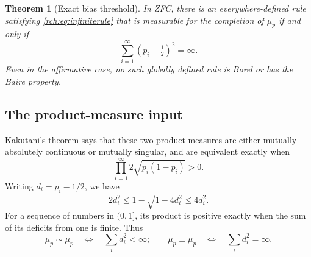 \documentclass[11pt]{article}
\newtheorem{theorem}{Theorem}[section]
\theoremstyle{definition}
\theoremstyle{remark}
\begin{document}
\begin{theorem}[Exact bias threshold]
\label{rch:thm:bias}
In ZFC, there is an everywhere-defined rule satisfying
\eqref{rch:eq:infiniterule} that is measurable for the completion of \(\mu_p\)
if and only if
\begin{equation}
 \boxed{\quad \sum_{i=1}^{\infty}(p_i-\tfrac12)^2=\infty.\quad}
 \label{rch:eq:biasthreshold}
\end{equation}
Even in the affirmative case, no such globally defined rule is Borel or has
the Baire property.
\end{theorem}

\subsection{The product-measure input}

Kakutani's theorem \cite{Kakutani} says that these two product measures are
either mutually absolutely continuous or mutually singular, and are equivalent
exactly when
\begin{equation}
 \prod_{i=1}^{\infty}2\sqrt{p_i(1-p_i)}>0.
 \label{rch:eq:kakutani}
\end{equation}
Writing \(d_i=p_i-1/2\), we have
\[
 2d_i^2\le1-\sqrt{1-4d_i^2}\le4d_i^2.
\]
For a sequence of numbers in \((0,1]\), its product is positive exactly when
the sum of its deficits from one is finite. Thus
\begin{equation}
 \mu_p\sim\mu_{\bar p}\quad\Longleftrightarrow\quad
 \sum_i d_i^2<\infty;
 \qquad
 \mu_p\perp\mu_{\bar p}\quad\Longleftrightarrow\quad
 \sum_i d_i^2=\infty.
 \label{rch:eq:productdichotomy}
\end{equation}
\end{document}
